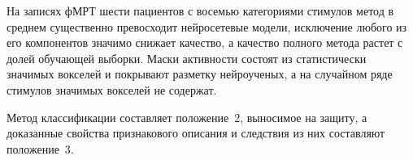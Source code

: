 На записях фМРТ шести пациентов с восемью категориями стимулов метод в среднем существенно превосходит нейросетевые модели, исключение любого из его компонентов значимо снижает качество, а качество полного метода растет с долей обучающей выборки. Маски активности состоят из статистически значимых вокселей и покрывают разметку нейроученых, а на случайном ряде стимулов значимых вокселей не содержат.

Метод классификации составляет положение~2, выносимое на защиту, а доказанные свойства признакового описания и следствия из них составляют положение~3.
